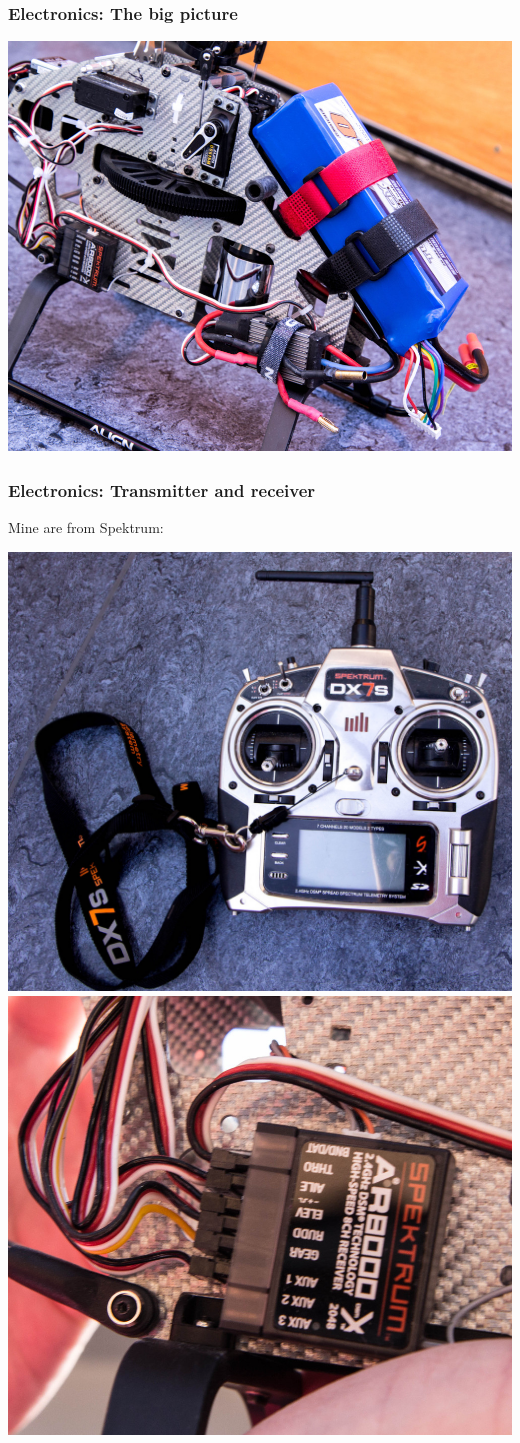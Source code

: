 \documentclass{beamer}
\begin{document}
\begin{frame}
\frametitle{Electronics: The big picture}

\begin{center}
	\includegraphics[width=.75\textwidth]{images/IMG_0637_cropped_smaller}
\end{center}
\end{frame}

\begin{frame}
\frametitle{Electronics: Transmitter and receiver}

Mine are from Spektrum:

\includegraphics[width=.5\textwidth]{images/IMG_0626_cropped_smaller}
\includegraphics[width=.5\textwidth]{images/IMG_0628_cropped_smaller}

\end{frame}

\end{document}
